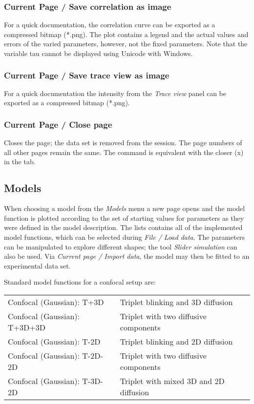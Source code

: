 \subsubsection{Current Page / Save correlation as image}
\label{sec:cp.sc}
For a quick documentation, the correlation curve can be exported as a compressed bitmap (*.png). The plot contains a legend and the actual values and errors of the varied parameters, however, not the fixed parameters. Note that the variable tau cannot be displayed using Unicode with Windows.

\subsubsection{Current Page / Save trace view as image}
\label{sec:cp.st}
For a quick documentation the intensity from the \textit{Trace view} panel can be exported as a compressed bitmap (*.png). 

\subsubsection{Current Page / Close page}
\label{sec:cp.cp}
Closes the page; the data set is removed from the session. The page numbers of all other pages remain the same. The command is equivalent with the closer (x) in the tab. 

\subsection{Models}

When choosing a model from the \textit{Models} menu a new page opens and the model function is plotted according to the set of starting values for parameters as they were defined in the model description. The lists contains all of the implemented model functions, which can be selected during \textit{File / Load data}. The parameters can be manipulated to explore different shapes; the tool \textit{Slider simulation} can also be used. Via \textit{Current page / Import data}, the model may then be fitted to an experimental data set. 

Standard model functions for a confocal setup are:

\begin{tabular}{l l}
Confocal (Gaussian): T+3D & Triplet blinking and 3D diffusion \\
Confocal (Gaussian): T+3D+3D & Triplet with two diffusive components \\
Confocal (Gaussian): T-2D &  Triplet blinking and 2D diffusion \\
Confocal (Gaussian): T-2D-2D & Triplet with two diffusive components \\
Confocal (Gaussian): T-3D-2D &  Triplet with mixed 3D and 2D diffusion \\
\end{tabular}

